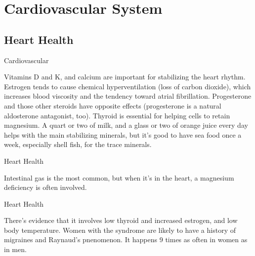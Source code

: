 \documentclass[11pt,oneside,openany,extrafontsizes]{memoir}
\begin{document}
\section{Cardiovascular System}
\subsection{Heart Health}

\begin{standalonequote}{Cardiovascular}

    \begin{answer}
        Vitamins D and K, and calcium are important for stabilizing the heart rhythm. Estrogen tends to cause chemical hyperventilation (loss of carbon dioxide), which increases blood viscosity and the tendency toward atrial fibrillation. Progesterone and those other steroids have opposite effects (progesterone is a natural aldosterone antagonist, too). Thyroid is essential for helping cells to retain magnesium. A quart or two of milk, and a glass or two of orange juice every day helps with the main stabilizing minerals, but it's good to have sea food once a week, especially shell fish, for the trace minerals.
    \end{answer}
\end{standalonequote}

\begin{standalonequote}{Heart Health}

    \begin{answer}
      Intestinal gas is the most common, but when it's in the heart, a magnesium deficiency is often involved.
    \end{answer}
\end{standalonequote}

\begin{standalonequote}{Heart Health}

    \begin{answer}
      There's evidence that it involves low thyroid and increased estrogen, and low body temperature. Women with the syndrome are likely to have a history of migraines and Raynaud's pnenomenon. It happens 9 times as often in women as in men.
    \end{answer}
\end{standalonequote}
\end{document}
